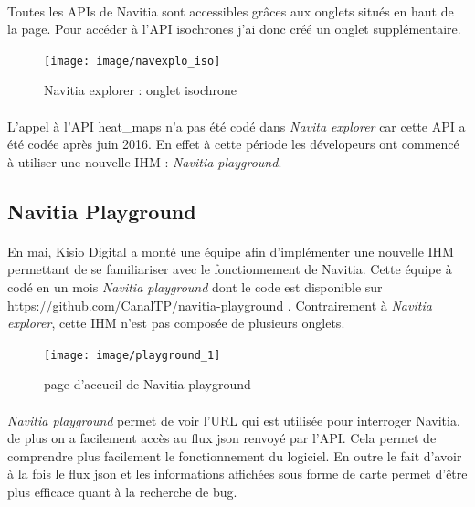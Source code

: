\documentclass[a4paper]{report}
\begin{document}
\paragraph{} Toutes les APIs de Navitia sont accessibles grâces aux onglets situés en haut de la page. Pour accéder à l'API isochrones j'ai donc créé un onglet supplémentaire.

\begin{figure}[H]
	\begin{center}
		\texttt{[image: image/navexplo\_iso]}
		\caption{Navitia explorer : onglet isochrone}
		\label{Navitia explorer : onglet isochrone}
	\end{center}
\end{figure}

\paragraph{} L'appel à l'API heat\_maps n'a pas été codé dans \emph{Navita explorer} car cette API a été codée après juin 2016. En effet à cette période les dévelopeurs ont commencé à utiliser une nouvelle IHM : \emph{Navitia playground}.


\subsection{Navitia Playground}

\paragraph{} En mai, Kisio Digital a monté une équipe afin d'implémenter une nouvelle IHM permettant de se familiariser avec le fonctionnement de Navitia. Cette équipe à codé en un mois \emph{Navitia playground} dont le code est disponible sur \color{blue} https://github.com/CanalTP/navitia-playground \color{black}. Contrairement à \emph{Navitia explorer}, cette IHM n'est pas composée de plusieurs onglets. 

\begin{figure}[H]
	\begin{center}
		\texttt{[image: image/playground\_1]}
		\caption{page d'accueil de Navitia playground}
		\label{page d'accueil de Navitia playground}
	\end{center}
\end{figure}

\paragraph{} \emph{Navitia playground} permet de voir l'URL qui est utilisée pour interroger Navitia, de plus on a facilement accès au flux json renvoyé par l'API. Cela permet de comprendre plus facilement le fonctionnement du logiciel. En outre le fait d'avoir à la fois le flux json et les informations affichées sous forme de carte permet d'être plus efficace quant à la recherche de bug.
\end{document}
